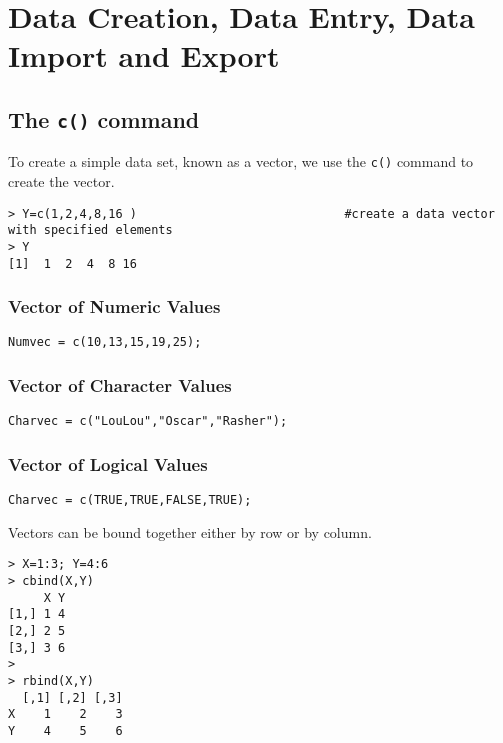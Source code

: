 \documentclass[a4paper,12pt]{article}
\begin{document}

\newpage
\section{Data Creation, Data Entry, Data Import and Export}

\subsection{The \texttt{c()} command}
To create a simple data set, known as a vector, we use the \texttt{c()} command to create the vector.
\begin{verbatim}
> Y=c(1,2,4,8,16 )                             #create a data vector with specified elements
> Y
[1]  1  2  4  8 16
\end{verbatim}
\subsubsection{Vector of Numeric Values}
\begin{verbatim}
Numvec = c(10,13,15,19,25);
\end{verbatim}
\subsubsection{Vector of Character Values}
\begin{verbatim}
Charvec = c("LouLou","Oscar","Rasher");
\end{verbatim}

\subsubsection{Vector of Logical Values}
\begin{verbatim}
Charvec = c(TRUE,TRUE,FALSE,TRUE);
\end{verbatim}

Vectors can be bound together either by row or by column.
\begin{verbatim}
> X=1:3; Y=4:6
> cbind(X,Y)
     X Y
[1,] 1 4
[2,] 2 5
[3,] 3 6
>
> rbind(X,Y)
  [,1] [,2] [,3]
X    1    2    3
Y    4    5    6
\end{verbatim}
\end{document}
